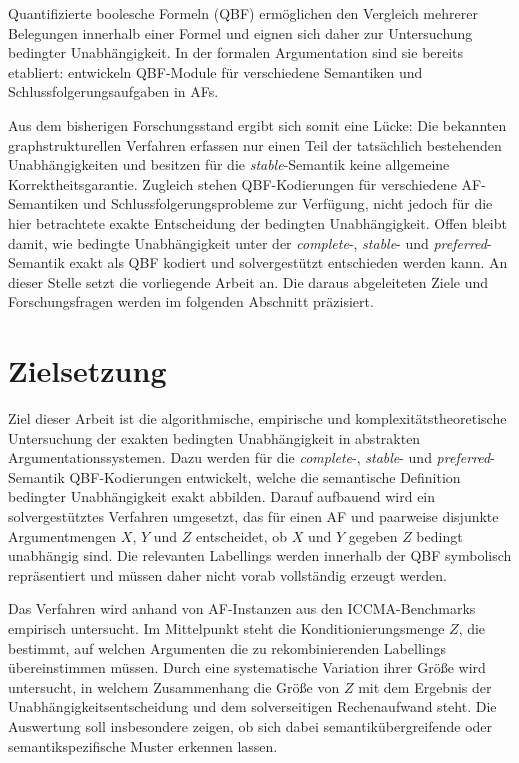 Quantifizierte boolesche Formeln (QBF) ermöglichen den Vergleich 
mehrerer Belegungen innerhalb einer Formel und eignen sich daher 
zur Untersuchung bedingter Unabhängigkeit. In der formalen 
Argumentation sind sie bereits etabliert: 
\citeauthor*{egly:woltran:2006:reasoning-qbf} \cite{egly:woltran:2006:reasoning-qbf} 
entwickeln QBF-Module für verschiedene Semantiken 
und Schlussfolgerungsaufgaben in AFs.

Aus dem bisherigen Forschungsstand ergibt sich somit eine Lücke: Die
bekannten graphstrukturellen Verfahren erfassen nur einen Teil der
tatsächlich bestehenden Unabhängigkeiten und besitzen für die
\emph{stable}-Semantik keine allgemeine Korrektheitsgarantie. Zugleich
stehen QBF-Kodierungen für verschiedene AF-Semantiken und
Schlussfolgerungsprobleme zur Verfügung, nicht jedoch für die hier
betrachtete exakte Entscheidung der bedingten Unabhängigkeit. Offen 
bleibt damit, wie bedingte
Unabhängigkeit unter der \emph{complete}-, \emph{stable}- und
\emph{preferred}-Semantik exakt als QBF kodiert und solvergestützt
entschieden werden kann. An dieser Stelle setzt die vorliegende Arbeit an.
Die daraus abgeleiteten Ziele und Forschungsfragen werden im folgenden
Abschnitt präzisiert.

\section{Zielsetzung}
\label{sec:einleitung-motivation}

Ziel dieser Arbeit ist die algorithmische, empirische und
komplexitätstheoretische Untersuchung der exakten bedingten Unabhängigkeit
in abstrakten Argumentationssystemen. Dazu werden für die
\emph{complete}-, \emph{stable}- und \emph{preferred}-Semantik
QBF-Kodierungen entwickelt, welche die semantische Definition bedingter
Unabhängigkeit exakt abbilden. Darauf aufbauend wird ein solvergestütztes
Verfahren umgesetzt, das für einen AF und paarweise disjunkte
Argumentmengen \(X\), \(Y\) und \(Z\) entscheidet, ob \(X\) und \(Y\)
gegeben \(Z\) bedingt unabhängig sind. Die relevanten Labellings werden
innerhalb der QBF symbolisch repräsentiert und müssen daher nicht vorab
vollständig erzeugt werden.

Das Verfahren wird anhand von AF-Instanzen aus den ICCMA-Benchmarks
\cite{bistarelli:2025:iccma,apostolakis:2025:iccma-instances} empirisch untersucht. 
Im Mittelpunkt steht die Konditionierungsmenge \(Z\), die bestimmt, auf
welchen Argumenten die zu rekombinierenden Labellings übereinstimmen
müssen. Durch eine systematische Variation ihrer Größe wird
untersucht, in welchem Zusammenhang die Größe von \(Z\) mit dem Ergebnis
der Unabhängigkeitsentscheidung und dem solverseitigen Rechenaufwand
steht. Die Auswertung soll insbesondere zeigen, ob sich dabei
semantikübergreifende oder semantikspezifische Muster erkennen lassen.

